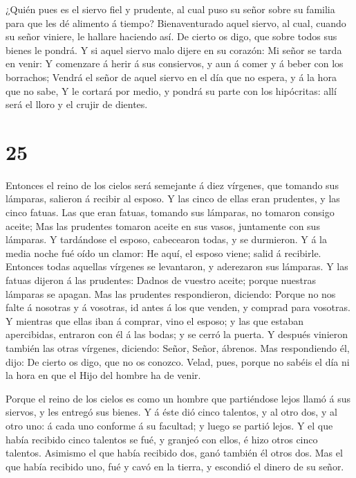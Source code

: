  ¿Quién pues es el siervo fiel y prudente, al cual puso su
señor sobre su familia para que les dé alimento á tiempo? 
Bienaventurado aquel siervo, al cual, cuando su señor viniere, le
hallare haciendo así.  De cierto os digo, que sobre todos
sus bienes le pondrá.  Y si aquel siervo malo dijere en su
corazón: Mi señor se tarda en venir:  Y comenzare á herir á
sus consiervos, y aun á comer y á beber con los borrachos; 
Vendrá el señor de aquel siervo en el día que no espera, y á la hora que
no sabe,  Y le cortará por medio, y pondrá su parte con los
hipócritas: allí será el lloro y el crujir de dientes.

\hypertarget{section-24}{%
\section{25}\label{section-24}}

 Entonces el reino de los cielos será semejante á diez
vírgenes, que tomando sus lámparas, salieron á recibir al esposo.
 Y las cinco de ellas eran prudentes, y las cinco fatuas.
 Las que eran fatuas, tomando sus lámparas, no tomaron
consigo aceite;  Mas las prudentes tomaron aceite en sus
vasos, juntamente con sus lámparas.  Y tardándose el esposo,
cabecearon todas, y se durmieron.  Y á la media noche fué
oído un clamor: He aquí, el esposo viene; salid á recibirle.
 Entonces todas aquellas vírgenes se levantaron, y
aderezaron sus lámparas.  Y las fatuas dijeron á las
prudentes: Dadnos de vuestro aceite; porque nuestras lámparas se apagan.
 Mas las prudentes respondieron, diciendo: Porque no nos
falte á nosotras y á vosotras, id antes á los que venden, y comprad para
vosotras.  Y mientras que ellas iban á comprar, vino el
esposo; y las que estaban apercibidas, entraron con él á las bodas; y se
cerró la puerta.  Y después vinieron también las otras
vírgenes, diciendo: Señor, Señor, ábrenos.  Mas
respondiendo él, dijo: De cierto os digo, que no os conozco.
 Velad, pues, porque no sabéis el día ni la hora en que el
Hijo del hombre ha de venir.

 Porque el reino de los cielos es como un hombre que
partiéndose lejos llamó á sus siervos, y les entregó sus bienes.
 Y á éste dió cinco talentos, y al otro dos, y al otro uno:
á cada uno conforme á su facultad; y luego se partió lejos.
 Y el que había recibido cinco talentos se fué, y granjeó
con ellos, é hizo otros cinco talentos.  Asimismo el que
había recibido dos, ganó también él otros dos.  Mas el que
había recibido uno, fué y cavó en la tierra, y escondió el dinero de su
señor.

